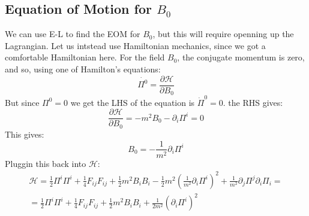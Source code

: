 \documentclass{article}
\begin{document}
\subsection{Equation of Motion for $B_0$}
We can use E-L to find the EOM for $B_0$, but this will require openning up the Lagrangian. Let us intstead use Hamiltonian mechanics, since we got a comfortable Hamiltonian here. For the field $B_0$, the conjugate momentum is zero, and so, using one of Hamilton's equations:
\begin{equation}
    \dot{\Pi^0} = \frac{\partial \mathcal{H}}{\partial B_0}
\end{equation}
But since $\Pi^0 = 0$ we get the LHS of the equation is $\dot{\Pi}^0 = 0$. the RHS gives:
\begin{equation}
    \frac{\partial \mathcal{H}}{\partial B_0} = -m^2 B_0 - \partial_i \Pi^i = 0
\end{equation}
This gives:
\begin{equation}
    B_0 = -\frac{1}{m^2}\partial_i \Pi^i
\end{equation}
Pluggin this back into $\mathcal{H}$:
\begin{equation}
\begin{gathered}
    \mathcal{H} = \frac{1}{2}\Pi^i \Pi^i + \frac{1}{4}F_{ij}F_{ij} + \frac{1}{2}m^2 B_i B_i - \frac{1}{2}m^2 \left(\frac{1}{m^2}\partial_i \Pi^i\right)^2 + \frac{1}{m^2}\partial_j \Pi^j \partial_i \Pi_i = \\ =
    \frac{1}{2}\Pi^i \Pi^i + \frac{1}{4}F_{ij}F_{ij} + \frac{1}{2}m^2 B_i B_i + \frac{1}{2m^2} \left(\partial_i \Pi^i\right)^2
\end{gathered}
\end{equation}
\end{document}
